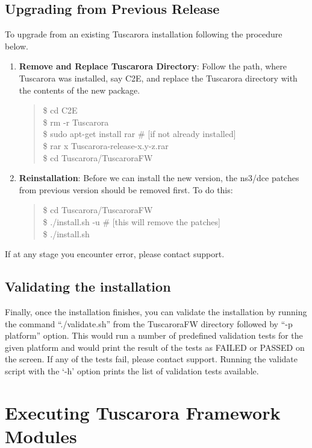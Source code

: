 \subsection{Upgrading from Previous Release}
To upgrade from an existing Tuscarora installation following the procedure below. 
\begin{enumerate}
	\item \textbf{Remove and Replace Tuscarora Directory}: Follow the path, where Tuscarora was installed, say C2E, and replace the Tuscarora directory with the contents of the new package. 
	\begin{quote}
		\$ cd C2E\\
		\$ rm -r Tuscarora\\
		\$ sudo apt-get install rar \# [if not already installed]\\
		\$ rar x Tuscarora-release-x.y-z.rar\\
		\$ cd Tuscarora/TuscaroraFW \\
	\end{quote}
	
	\item \textbf{Reinstallation}: Before we can install the new version, the ns3/dce patches from previous version should be removed first. To do this:

	\begin{quote}
		\$ cd Tuscarora/TuscaroraFW \\
		\$ ./install.sh -u  \# [this will remove the patches]\\
	    \$ ./install.sh \\
	\end{quote}
\end{enumerate}


If at any stage you encounter error, please contact support.


\subsection{Validating the installation}
Finally, once the installation finishes, you can validate the installation by running the command ``./validate.sh'' from the TuscaroraFW directory followed by ``-p platform'' option. This would run a number of predefined validation tests for the given platform and would print the result of the tests as FAILED or PASSED on the screen. If any of the tests fail, please contact support. Running the validate script with the `-h' option prints the list of validation tests available.


\section{Executing Tuscarora Framework Modules}

